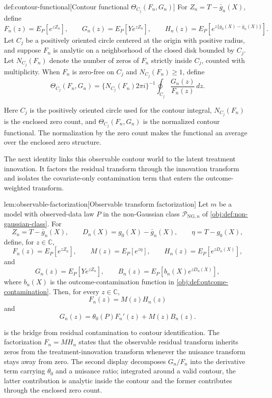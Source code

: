 \begin{definitionv}{def:contour-functional}[Contour functional \(\Theta_{C_j}(F_n,G_n)\)]
For \(Z_n=T-\bar g_n(X)\), define
\[
F_n(z)=E_P[e^{zZ_n}],
\qquad
G_n(z)=E_P[Ye^{zZ_n}],
\qquad
H_n(z)=E_P[e^{z\{g_0(X)-\bar g_n(X)\}}].
\]
Let \(C_j\) be a positively oriented circle centered at the origin with positive radius, and suppose \(F_n\) is analytic on a neighborhood of the closed disk bounded by \(C_j\). Let \(N_{C_j}(F_n)\) denote the number of zeros of \(F_n\) strictly inside \(C_j\), counted with multiplicity. When \(F_n\) is zero-free on \(C_j\) and \(N_{C_j}(F_n)\ge1\), define
\[
\Theta_{C_j}(F_n,G_n)
=
\{N_{C_j}(F_n)2\pi i\}^{-1}
\oint_{C_j}\frac{G_n(z)}{F_n(z)}\,dz .
\]
\end{definitionv}

Here \(C_j\) is the positively oriented circle used for the contour integral, \(N_{C_j}(F_n)\) is the enclosed zero count, and \(\Theta_{C_j}(F_n,G_n)\) is the normalized contour functional. The normalization by the zero count makes the functional an average over the enclosed zero structure.

The next identity links this observable contour world to the latent treatment innovation. It factors the residual transform through the innovation transform and isolates the covariate-only contamination term that enters the outcome-weighted transform.

\begin{lemmav}{lem:observable-factorization}[Observable transform factorization]
Let \(m\) be a model with observed-data law \(P\) in the non-Gaussian class \(\mathcal P_{\mathrm{NG},n}\) of \cref{obj:def:non-gaussian-class}.  For
\[
Z_n=T-\bar g_n(X),\qquad
D_n(X)=g_0(X)-\bar g_n(X),\qquad
\eta=T-g_0(X),
\]
define, for \(z\in\mathbb C\),
\[
F_n(z)=E_P[e^{zZ_n}],\qquad
M(z)=E_P[e^{z\eta}],\qquad
H_n(z)=E_P[e^{zD_n(X)}],
\]
and
\[
G_n(z)=E_P[Ye^{zZ_n}],\qquad
B_n(z)=E_P[b_n(X)e^{zD_n(X)}],
\]
where \(b_n(X)\) is the outcome-contamination function in \cref{obj:def:outcome-contamination}.  Then, for every \(z\in\mathbb C\),
\[
F_n(z)=M(z)H_n(z)
\]
and
\[
G_n(z)=\theta_0(P)F_n'(z)+M(z)B_n(z).
\]
\end{lemmav}

 is the bridge from residual contamination to contour identification. The factorization \(F_n=MH_n\) states that the observable residual transform inherits zeros from the treatment-innovation transform whenever the nuisance transform stays away from zero. The second display decomposes \(G_n/F_n\) into the derivative term carrying \(\theta_0\) and a nuisance ratio; integrated around a valid contour, the latter contribution is analytic inside the contour and the former contributes through the enclosed zero count.

